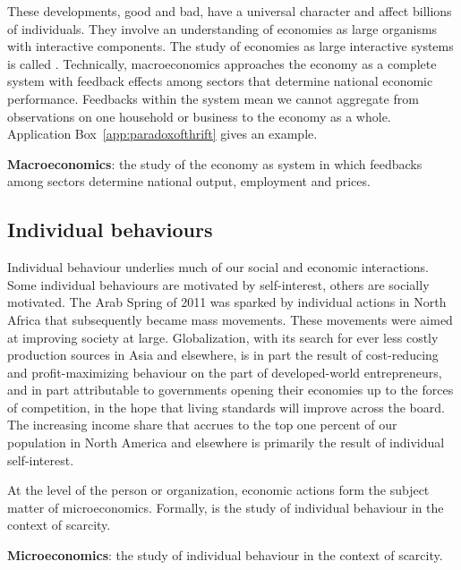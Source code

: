 These developments, good and bad, have a universal character and affect billions of individuals. They involve an understanding of economies as large organisms with interactive components. The study of economies as large interactive systems is called . Technically, macroeconomics approaches the economy as a complete system with feedback effects among sectors that determine national economic performance. Feedbacks within the system mean we cannot aggregate from observations on one household or business to the economy as a whole. Application Box~\ref{app:paradoxofthrift} gives an example.

\begin{DefBox}
\textbf{Macroeconomics}: the study of the economy as system in which feedbacks among sectors determine national output, employment and prices.
\end{DefBox}

\subsection*{Individual behaviours}

Individual behaviour underlies much of our social and economic interactions. Some individual behaviours are motivated by self-interest, others are socially motivated. The Arab Spring of 2011 was sparked by individual actions in North Africa that subsequently became mass movements. These movements were aimed at improving society at large. Globalization, with its search for ever less costly production sources in Asia and elsewhere, is in part the result of cost-reducing and profit-maximizing behaviour on the part of developed-world entrepreneurs, and in part attributable to governments opening their economies up to the forces of competition, in the hope that living standards will improve across the board. The increasing income share that accrues to the top one percent of our population in North America and elsewhere is primarily the result of individual self-interest. 

At the level of the person or organization, economic actions form the subject matter of microeconomics. Formally,  is the study of individual behaviour in the context of scarcity.

\begin{DefBox}
\textbf{Microeconomics}: the study of individual behaviour in the context of scarcity.
\end{DefBox}

